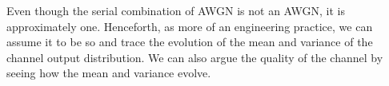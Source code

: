 \begin{remark}
    Even though the serial combination of AWGN is not an AWGN, it is approximately one. Henceforth, as more of an engineering practice, we can assume it to be so and trace the evolution of the mean and variance of the channel output distribution. We can also argue the quality of the channel by seeing how the mean and variance evolve.
\end{remark}